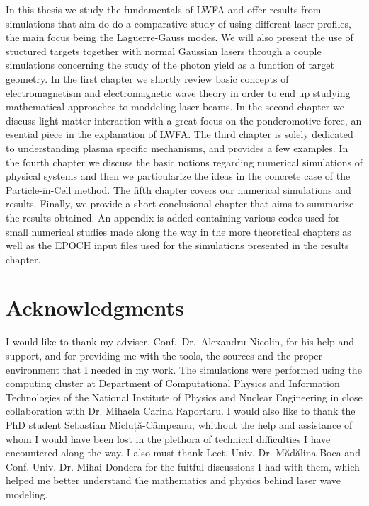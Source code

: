 \documentclass[12pt, class=report, crop=false]{standalone}
\begin{document}
In this thesis we study the fundamentals of LWFA and offer results from simulations that aim do do a comparative study of using different laser profiles, the main focus being the Laguerre-Gauss modes. We will also present the use of stuctured targets together with normal Gaussian lasers through a couple simulations concerning the study of the photon yield as a function of target geometry. In the first chapter we shortly review basic concepts of electromagnetism and electromagnetic wave theory in order to end up studying mathematical approaches to moddeling laser beams. In the second chapter we discuss light-matter interaction with a great focus on the ponderomotive force, an esential piece in the explanation of LWFA. The third chapter is solely dedicated to understanding plasma specific mechanisms, and provides a few examples. In the fourth chapter we discuss the basic notions regarding numerical simulations of physical systems and then we particularize the ideas in the concrete case of the Particle-in-Cell method. The fifth chapter covers our numerical simulations and results. Finally, we provide a short conclusional chapter that aims to summarize the results obtained. An appendix is added containing various codes used for small numerical studies made along the way in the more theoretical chapters as well as the EPOCH input files used for the simulations presented in the results chapter.

\section*{Acknowledgments}
I would like to thank my adviser, Conf.~Dr.~Alexandru Nicolin, for his help and support, and for providing me with the tools, the sources and the proper environment that I needed in my work. The simulations were performed using the computing cluster at Department of Computational Physics and Information Technologies of the National Institute of Physics and Nuclear Engineering in close collaboration with Dr. Mihaela Carina Raportaru. I would also like to thank the PhD student Sebastian Micluță-Câmpeanu, whithout the help and assistance of whom I would have been lost in the plethora of technical difficulties I have encountered along the way. I also must thank Lect. Univ. Dr. Mădălina Boca  and Conf. Univ. Dr. Mihai Dondera for the fuitful discussions I had with them, which helped me better understand the mathematics and physics behind laser wave modeling.
\end{document}
